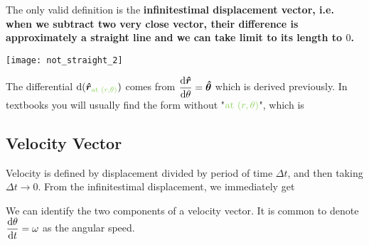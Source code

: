 \documentclass[class=article, crop=false, 12pt]{standalone}
\begin{document}
The only valid definition is the \bf{infinitestimal displacement vector}, 
i.e. when we subtract two very close vector, 
their difference is approximately a straight line and we can take limit to its length to $0$. 
\begin{center}
    \begin{minipage}{0.4\linewidth}
        \centering
    \end{minipage}
    \hspace{0.05\textwidth}
    \begin{minipage}{0.3\linewidth}
        \centering
        \texttt{[image: not\_straight\_2]}
    \end{minipage}
\end{center}


The differential $\dd{(\hhat{r}_\green{\text{at }(r,\theta)})}$ comes from 
$\dvv{\hhat{r}}{\theta} = \hhat{\theta}$ which is derived previously. 
In textbooks you will usually find the form without "$\green{\text{at }(r,\theta)}$", 
which is




\subsection{Velocity Vector}

Velocity is defined by displacement divided by period of time $\Delta t$, and then taking $\Delta t \to 0$.
From the infinitestimal displacement, we immediately get

We can identify the two components of a velocity vector. 
It is common to denote $\dvv{\theta}{t} = \omega$ as the angular speed.
\end{document}
